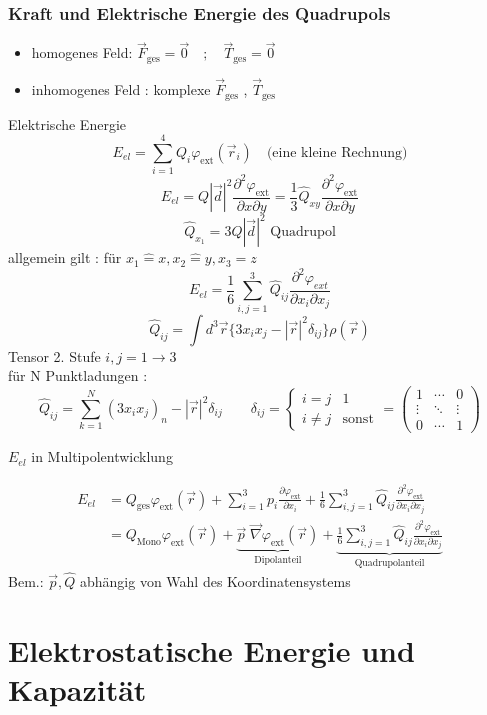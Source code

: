 \documentclass[titlepage,12pt,a4paper,ngerman]{report}
\newcommand{\tx}[1]{\textrm{#1}}
\newcommand{\casess}[4]{\left\{ \begin{array}{ll} {#1} & {#2} \\ {#3} & {#4} \end{array} \right.}
\begin{document}
\subsubsection{Kraft und Elektrische Energie des Quadrupols}
\begin{itemize}
\item homogenes Feld: $\vec{F}_{\tx{ges}} = \vec{0} \quad ; \quad \vec{T}_{\tx{ges}} = \vec{0}$
\item inhomogenes Feld : komplexe $\vec{F}_{\tx{ges}}$ , $\vec{T}_{\tx{ges}}$
\end{itemize}
Elektrische Energie
$$ E_{el} = \sum ^4_{i=1} Q_i \varphi_{\tx{ext}}(\vec{r}_i) \quad \textrm{(eine kleine Rechnung)}$$
$$ E_{el} = Q |\vec{d}|^2 \frac{\partial ^2 \varphi_{\tx{ext}}}{\partial x \partial y} = \frac{1}{3} \hat{Q}_{xy} \frac{\partial ^2 \varphi_{\tx{ext}}}{\partial x \partial y} $$
$$\hat{Q}_{x_1} = 3 Q |\vec{d}|^2 \textrm{ Quadrupol}$$
allgemein gilt : 
für $ x_1 \widehat{=} x, x_2 \widehat{=} y, x_3 \widehat{=} z$
$$E_{el} = \frac{1}{6} \sum^3_{i,j=1} \hat{Q}_{ij} \frac{\partial ^2 \varphi_{ext}}{\partial x_i \partial x_j}$$
$$\hat{Q}_{ij} = \int d^3 \vec{r} \{ 3x_ix_j - |\vec{r}|^2 \delta_{ij} \} \rho (\vec{r})$$
Tensor 2. Stufe $i,j = 1 \rightarrow 3$\\
für N Punktladungen : $$\hat{Q}_{ij} = \sum^N_{k=1} (3x_ix_j)_n - |\vec{r}|^2 \delta_{ij} \qquad \delta_{ij}= \casess{i=j}{1}{i \neq j}{\tx{sonst}} = \begin{pmatrix}
1 & \cdots & 0 \\
\vdots & \ddots & \vdots\\
0 & \cdots & 1 
\end{pmatrix}$$

$E_{el}$ in Multipolentwicklung

\begin{align*}
E_{el} &= Q_{\tx{ges}} \varphi_{\tx{ext}} (\vec{r})  + \sum^3_{i=1} p_i \frac{\partial \varphi_{\tx{ext}}}{\partial x_i} + \frac{1}{6} \sum^3_{i,j = 1} \hat{Q}_{ij} \frac{\partial ^2 \varphi_{\tx{ext}}}{\partial x_i \partial x_j} \\
&= Q_{\tx{Mono}} \varphi_{\tx{ext}}(\vec{r}) + \underbrace{\vec{p} \; \vec{\nabla} \varphi_{\tx{ext}} (\vec{r})}_{\tx{Dipolanteil}} + \underbrace{ \frac{1}{6} \sum^3_{i,j = 1} \hat{Q}_{ij} \frac{\partial ^2 \varphi_{\tx{ext}}}{\partial x_i \partial x_j} }_{\tx{Quadrupolanteil}}
\end{align*}
Bem.: $\vec{p}, \hat{Q}$ abhängig von Wahl des Koordinatensystems
\section{Elektrostatische Energie und Kapazität}
\end{document}
